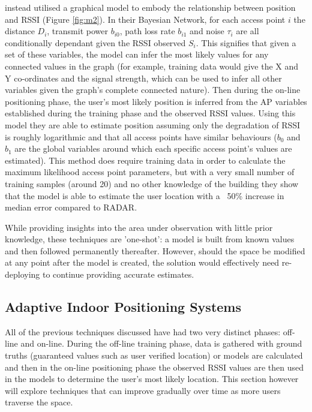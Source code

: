 \documentclass{UoYCSproject}
\begin{document}
                \citet{madigan2005bayesian} instead utilised a graphical model to embody the relationship between position and RSSI (Figure \ref{fig:m2}). In their Bayesian Network, for each access point $i$ the distance $D_i$, transmit power $b_{i0}$, path loss rate $b_{i1}$ and noise $\tau_i$ are all conditionally dependant given the RSSI observed $S_i$. This signifies that given a set of these variables, the model can infer the most likely values for any connected values in the graph (for example, training data would give the X and Y co-ordinates and the signal strength, which can be used to infer all other variables given the graph's complete connected nature). Then during the on-line positioning phase, the user's most likely position is inferred from the AP variables established during the training phase and the observed RSSI values. Using this model they are able to estimate position assuming only the degradation of RSSI is roughly logarithmic and that all access points have similar behaviours ($b_0$ and $b_1$ are the global variables around which each specific access point's values are estimated). This method does require training data in order to calculate the maximum likelihood access point parameters, but with a very small number of training samples (around 20) and no other knowledge of the building they show that the model is able to estimate the user location with a ~50\% increase in median error compared to RADAR.
                
                While providing insights into the area under observation with little prior knowledge, these techniques are 'one-shot': a model is built from known values and then followed permanently thereafter. However, should the space be modified at any point after the model is created, the solution would effectively need re-deploying to continue providing accurate estimates.
            
            \subsection{Adaptive Indoor Positioning Systems}
            \label{sec:adaptive}
            
                All of the previous techniques discussed have had two very distinct phases: off-line and on-line. During the off-line training phase, data is gathered with ground truths (guaranteed values such as user verified location) or models are calculated and then in the on-line positioning phase the observed RSSI values are then used in the models to determine the user's most likely location. This section however will explore techniques that can improve gradually over time as more users traverse the space.
                
\end{document}
